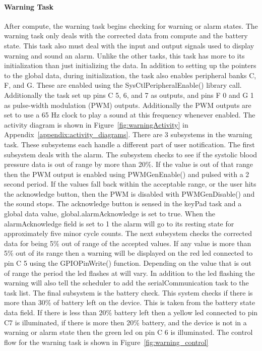 \documentclass[12pt]{article} %
\begin{document}
    \paragraph{Warning Task} After compute, the warning task begins checking
    for warning or alarm states. The warning task only deals with the corrected
    data from compute and the battery state. This task also must deal with the
    input and output signals used to display warning and sound an alarm. Unlike
    the other tasks, this task has more to its initialization than just
    initializing the data. In addition to setting up the pointers to the global
    data, during initialization, the task also enables peripheral banks C, F,
    and G. These are enabled using the SysCtlPeripheralEnable() library call.
    Additionally the task set up pins C 5, 6, and 7 as outputs, and pins F 0
    and G 1 as pulse-width modulation (PWM) outputs. Additionally the PWM outputs are set to use a 65 Hz
    clock to play a sound at this frequency whenever enabled. The activity
    diagram is shown in Figure~\ref{fig:warningActivity} in Appendix~\ref{appendix:activity_diagrams}. There
    are 3 subsystems in the warning task. These subsystems each handle a
    different part of user notification. The first subsystem deals with the
    alarm. The subsystem checks to see if the systolic blood pressure data is
    out of range by more than 20\%. If the value is out of that range then the
    PWM output is enabled using PWMGenEnable() and pulsed with a 2 second period.
    If the values fall back within the acceptable range, or the user hits the
    acknowledge button, then the PWM is disabled with PWMGenDisable() and the
    sound stops. The acknowledge button is sensed in the keyPad task and a
    global data value, global.alarmAcknowledge is set to true. When the alarmAcknowledge
    field is set to 1 the alarm will go to its resting state for approximately
five minor cycle counts. The next
    subsystem checks the corrected data for being 5\% out of range of the
    accepted values. If any value is more than 5\% out of its range then a
    warning will be displayed on the red led connected to pin C 5 using the
    GPIOPinWrite() function. Depending on the value that is out of range the
    period the led flashes at will vary. In addition to the led flashing the
    warning will also tell the scheduler to add the serialCommunication task to
    the task list. The final subsystem is the battery check. This system checks
    if there is more than 30\% of battery left on the device. This is taken
    from the battery state data field. If there is less than 20\% battery left
    then a yellow led connected to pin C7 is illuminated, if there is more then
    20\% battery, and the device is not in a warning or alarm state then the
		green led on pin C 6 is illuminated. The control flow for the warning task is shown in Figure~\ref{fig:warning_control}
\end{document}
